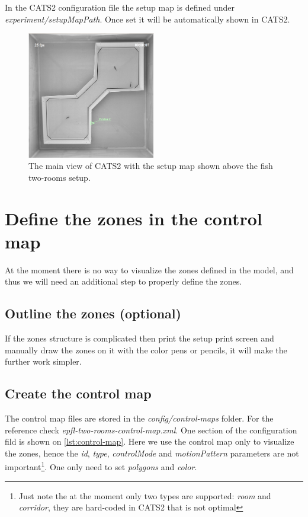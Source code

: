 \documentclass{styles/assisi}
\begin{document}
In the CATS2 configuration file the setup map is defined under {\it experiment/setupMapPath}. 
Once set it will be automatically shown in CATS2. 

\begin{figure}[ht]
\centering
\includegraphics[width=0.5\textwidth]{./figs/setup-map.png}
\caption{The main view of CATS2 with the setup map shown above the fish two-rooms setup.}
\label{fig:setup-map}
\end{figure}

\section{Define the zones in the control map}
At the moment there is no way to visualize the zones defined in the model, and thus we will need an additional step to properly define the zones. 

\subsection{Outline the zones (optional)}
If the zones structure is complicated then print the setup print screen and manually draw the zones on it with the color pens or pencils, it will make the further work simpler.

\subsection{Create the control map}
The control map files are stored in the {\it config/control-maps} folder. For the reference check {\it epfl-two-rooms-control-map.xml}. One section of the configuration fild is shown on \ref{lst:control-map}. Here we use the control map only to visualize the zones, hence the {\it id}, {\it type}, {\it controlMode} and {\it motionPattern} parameters are not important\footnote{Just note the at the moment only two types are supported: {\it room} and {\it corridor}, they are hard-coded in CATS2 that is not optimal}. One only need to set {\it polygons} and {\it color}.
\end{document}
